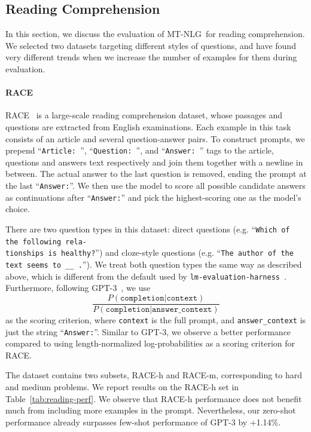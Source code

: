 \documentclass[11pt]{article}
\newcommand{\ours}{MT-NLG}
\begin{document}
\subsection{Reading Comprehension}

In this section, we discuss the evaluation of \ours~for reading comprehension. We selected two datasets targeting different styles of questions, and have found very different trends when we increase the number of examples for them during evaluation.

\paragraph{RACE} RACE~\citep{lai-etal-2017-race} is a large-scale reading comprehension dataset, whose passages and questions are extracted from English examinations. Each example in this task consists of an article and several question-answer pairs. To construct prompts, we prepend ``\texttt{Article: }'', ``\texttt{Question: }'', and ``\texttt{Answer: }'' tags to the article, questions and answers text respectively and join them together with a newline in between. The actual answer to the last question is removed, ending the prompt at the last ``\texttt{Answer:}''. We then use the model to score all possible candidate answers as continuations after ``\texttt{Answer:}'' and pick the highest-scoring one as the model's choice.

There are two question types in this dataset: direct questions (e.g. ``\texttt{Which of the following rela-\\tionships is healthy?}'') and cloze-style questions (e.g. ``\texttt{The author of the text seems to \_\_ .}''). We treat both question types the same way as described above, which is different from the default used by \texttt{lm-evaluation-harness}~\citep{eval-harness}. Furthermore, following GPT-3~\citep{brown2020language}, we use
\begin{equation*}
\frac{P(\mathtt{completion}|\mathtt{context})}{P(\mathtt{completion}|\mathtt{answer\_context})}
\end{equation*}
as the scoring criterion, where \texttt{context} is the full prompt, and \texttt{answer\_context} is just the string ``\texttt{Answer:}''. Similar to GPT-3, we observe a better performance compared to using length-normalized log-probabilities as a scoring criterion for RACE.

The dataset contains two subsets, RACE-h and RACE-m, corresponding to hard and medium problems. We report results on the RACE-h set in Table~\ref{tab:reading-perf}. We observe that RACE-h performance does not benefit much from including more examples in the prompt. Nevertheless, our zero-shot performance already surpasses few-shot performance of GPT-3 by +1.14\%.
\end{document}
